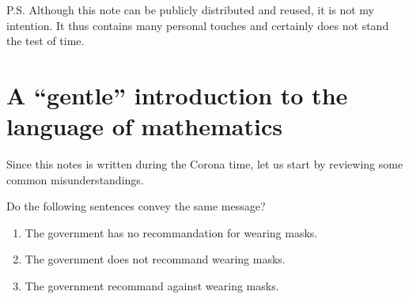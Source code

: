 \documentclass[
	fontsize=10pt, %
	twoside=true, %
	secnumdepth=1, %
	numbers=noenddot, %
]{kaobook}
\begin{document}
P.S. Although this note can be publicly distributed and reused, it is not my intention. It thus contains many personal touches and certainly does not stand the test of time.


\begingroup %

\setlength{\textheight}{23cm} %

\etocstandarddisplaystyle %
\etocstandardlines %

\tableofcontents %


\let\cleardoublepage\bigskip
\let\clearpage\bigskip


\endgroup


\mainmatter %
\chapter{A ``gentle'' introduction to the language of mathematics}

Since this notes is written during the Corona time, let us start by reviewing some common misunderstandings.

Do the following sentences convey the same message?
\begin{enumerate}
	\item The government has no recommandation for wearing masks.
	\item The government does not recommand wearing masks.
	\item The government recommand against wearing masks.
\end{enumerate}
\end{document}

